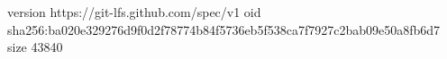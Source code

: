 version https://git-lfs.github.com/spec/v1
oid sha256:ba020e329276d9f0d2f78774b84f5736eb5f538ca7f7927c2bab09e50a8fb6d7
size 43840
